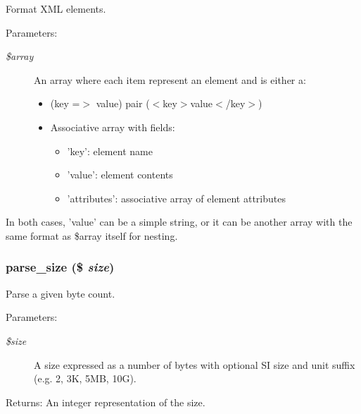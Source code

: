 Format XML elements.

\begin{Desc}
\item[Parameters:]
\begin{description}
\item[{\em \$array}]An array where each item represent an element and is either a:\begin{itemize}
\item (key =$>$ value) pair ($<$key$>$value$<$/key$>$)\item Associative array with fields:\begin{itemize}
\item 'key': element name\item 'value': element contents\item 'attributes': associative array of element attributes\end{itemize}
\end{itemize}
\end{description}
\end{Desc}
In both cases, 'value' can be a simple string, or it can be another array with the same format as \$array itself for nesting. \hypertarget{group__format_g08382023ada29bae2a6a94f22196b066}{
\subsubsection[{parse\_\-size}]{\setlength{\rightskip}{0pt plus 5cm}parse\_\-size (\$ {\em size})}}
\label{group__format_g08382023ada29bae2a6a94f22196b066}


Parse a given byte count.

\begin{Desc}
\item[Parameters:]
\begin{description}
\item[{\em \$size}]A size expressed as a number of bytes with optional SI size and unit suffix (e.g. 2, 3K, 5MB, 10G). \end{description}
\end{Desc}
\begin{Desc}
\item[Returns:]An integer representation of the size. \end{Desc}
